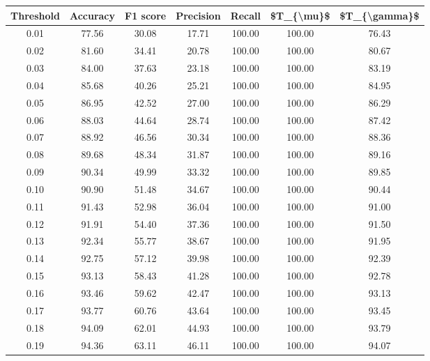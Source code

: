 \begin{tabular}{|c|c|c|c|c|c|c|}
\hline
 Threshold &  Accuracy &  F1 score &  Precision &  Recall &  \$T\_\{\textbackslash mu\}\$ &  \$T\_\{\textbackslash gamma\}\$ \\
\hline
      0.01 &     77.56 &     30.08 &      17.71 &  100.00 &     100.00 &         76.43 \\
      0.02 &     81.60 &     34.41 &      20.78 &  100.00 &     100.00 &         80.67 \\
      0.03 &     84.00 &     37.63 &      23.18 &  100.00 &     100.00 &         83.19 \\
      0.04 &     85.68 &     40.26 &      25.21 &  100.00 &     100.00 &         84.95 \\
      0.05 &     86.95 &     42.52 &      27.00 &  100.00 &     100.00 &         86.29 \\
      0.06 &     88.03 &     44.64 &      28.74 &  100.00 &     100.00 &         87.42 \\
      0.07 &     88.92 &     46.56 &      30.34 &  100.00 &     100.00 &         88.36 \\
      0.08 &     89.68 &     48.34 &      31.87 &  100.00 &     100.00 &         89.16 \\
      0.09 &     90.34 &     49.99 &      33.32 &  100.00 &     100.00 &         89.85 \\
      0.10 &     90.90 &     51.48 &      34.67 &  100.00 &     100.00 &         90.44 \\
      0.11 &     91.43 &     52.98 &      36.04 &  100.00 &     100.00 &         91.00 \\
      0.12 &     91.91 &     54.40 &      37.36 &  100.00 &     100.00 &         91.50 \\
      0.13 &     92.34 &     55.77 &      38.67 &  100.00 &     100.00 &         91.95 \\
      0.14 &     92.75 &     57.12 &      39.98 &  100.00 &     100.00 &         92.39 \\
      0.15 &     93.13 &     58.43 &      41.28 &  100.00 &     100.00 &         92.78 \\
      0.16 &     93.46 &     59.62 &      42.47 &  100.00 &     100.00 &         93.13 \\
      0.17 &     93.77 &     60.76 &      43.64 &  100.00 &     100.00 &         93.45 \\
      0.18 &     94.09 &     62.01 &      44.93 &  100.00 &     100.00 &         93.79 \\
      0.19 &     94.36 &     63.11 &      46.11 &  100.00 &     100.00 &         94.07 \\

\end{tabular}
